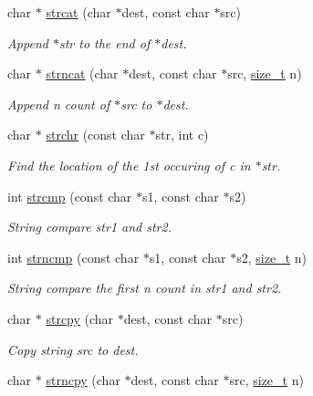 \begin{DoxyCompactItemize}
char $\ast$ \mbox{\hyperlink{a00074_adb8723e585ed29f2370cddf90f6891bc}{strcat}} (char $\ast$dest, const char $\ast$src)
\begin{DoxyCompactList}\small\item\em Append $\ast$str to the end of $\ast$dest. \end{DoxyCompactList}\item 
char $\ast$ \mbox{\hyperlink{a00074_a0aee928c2844a269966e4832fd2255c5}{strncat}} (char $\ast$dest, const char $\ast$src, \mbox{\hyperlink{a00074_a43b4547e12226fef871eed8afe191ad7}{size\+\_\+t}} n)
\begin{DoxyCompactList}\small\item\em Append n count of $\ast$src to $\ast$dest. \end{DoxyCompactList}\item 
char $\ast$ \mbox{\hyperlink{a00074_afcd97f487174f9092b0f23c7ac78a55a}{strchr}} (const char $\ast$str, int c)
\begin{DoxyCompactList}\small\item\em Find the location of the 1st occuring of c in $\ast$str. \end{DoxyCompactList}\item 
int \mbox{\hyperlink{a00074_a11bd144d7d44914099a3aeddf1c8567d}{strcmp}} (const char $\ast$s1, const char $\ast$s2)
\begin{DoxyCompactList}\small\item\em String compare str1 and str2. \end{DoxyCompactList}\item 
int \mbox{\hyperlink{a00074_a07f4a84c11c106e95c32b6ab509346ef}{strncmp}} (const char $\ast$s1, const char $\ast$s2, \mbox{\hyperlink{a00074_a43b4547e12226fef871eed8afe191ad7}{size\+\_\+t}} n)
\begin{DoxyCompactList}\small\item\em String compare the first n count in str1 and str2. \end{DoxyCompactList}\item 
char $\ast$ \mbox{\hyperlink{a00074_a7a82515b5d377be04817715c5465b647}{strcpy}} (char $\ast$dest, const char $\ast$src)
\begin{DoxyCompactList}\small\item\em Copy string src to dest. \end{DoxyCompactList}\item 
char $\ast$ \mbox{\hyperlink{a00074_a47d54f24198df56da51078a6c540b9ed}{strncpy}} (char $\ast$dest, const char $\ast$src, \mbox{\hyperlink{a00074_a43b4547e12226fef871eed8afe191ad7}{size\+\_\+t}} n)

\end{DoxyCompactItemize}
